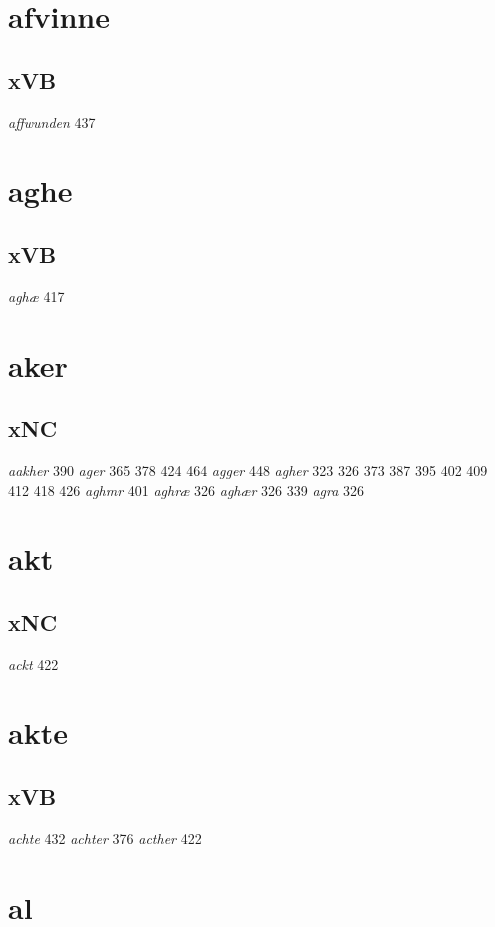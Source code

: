 \documentclass[a4paper,twocolumn]{article}
\begin{document}
\section{afvinne}
\label{sec:org1d18ad6}
\subsection{xVB}
\label{sec:orge7fb576}
\emph{affwunden} 437 
\section{aghe}
\label{sec:orgbf85f44}
\subsection{xVB}
\label{sec:orgf823df4}
\emph{aghæ} 417 
\section{aker}
\label{sec:org4693f40}
\subsection{xNC}
\label{sec:orgea5573a}
\emph{aakher} 390 \emph{ager} 365 378 424 464 \emph{agger} 448 \emph{agher} 323 326 373 387 395 402 409 412 418 426 \emph{aghmr} 401 \emph{aghræ} 326 \emph{aghær} 326 339 \emph{agra} 326 
\section{akt}
\label{sec:org04e0945}
\subsection{xNC}
\label{sec:orgc1b0e2f}
\emph{ackt} 422 
\section{akte}
\label{sec:orgfce077b}
\subsection{xVB}
\label{sec:org562d65d}
\emph{achte} 432 \emph{achter} 376 \emph{acther} 422 
\section{al}
\label{sec:orgca4d0ff}
\end{document}
